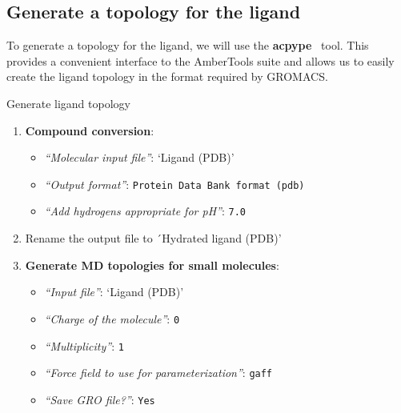 \documentclass[twocolumn]{bmcart}%
\providecommand{\tightlist}{%
  \setlength{\itemsep}{0pt}\setlength{\parskip}{0pt}}
\begin{document}
\subsection*{Generate a topology for the
ligand}\label{generate-a-topology-for-the-ligand}

To generate a topology for the ligand, we will use the \textbf{acpype}~\cite{SousadaSilva2012}
tool. This provides a convenient interface to the AmberTools suite and
allows us to easily create the ligand topology in the format required by
GROMACS.

\begin{handson_box_colour}{Generate ligand topology}

\begin{enumerate}
\def\labelenumi{\arabic{enumi}.}
\tightlist
\item
  \textbf{Compound conversion}:

  \begin{itemize}
  \tightlist
  \item
    \emph{``Molecular input file''}: `Ligand (PDB)'
  \item
    \emph{``Output format''}: \texttt{Protein Data Bank format (pdb)}
  \item
    \emph{``Add hydrogens appropriate for pH''}: \texttt{7.0}
  \end{itemize}
\item  
  Rename the output file to ´Hydrated ligand (PDB)'

\item
  \textbf{Generate MD topologies for small molecules}:
  \begin{itemize}
  \tightlist
  \item
    \emph{``Input file''}: `Ligand (PDB)'
  \item
    \emph{``Charge of the molecule''}: \texttt{0}
  \item
    \emph{``Multiplicity''}: \texttt{1}
  \item
    \emph{``Force field to use for parameterization''}:
    \texttt{gaff}
  \item
    \emph{``Save GRO file?''}: \texttt{Yes}
  \end{itemize}
\end{enumerate}

\end{handson_box_colour}
\end{document}
